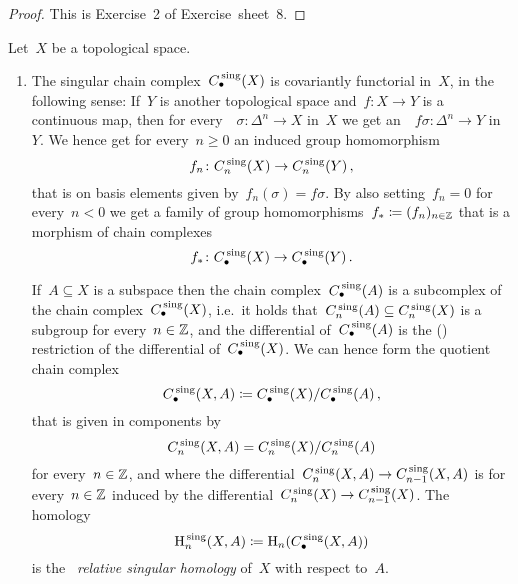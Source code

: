 \begin{proof}
  This is Exercise~2 of Exercise~sheet~8.
\end{proof}


\begin{example}
  Let~$X$ be a topological space.
  \begin{enumerate}
    \item
      The singular chain complex~$C_\bullet^{\,\mathrm{sing}}(X)$ is covariantly functorial in~$X$, in the following sense:
      If~$Y$ is another topological space and~$f \colon X \to Y$ is a continuous map, then for every~{}~$\sigma \colon \Delta^n \to X$ in~$X$ we get an~{}~$f \sigma \colon \Delta^n \to Y$ in~$Y$.
      We hence get for every~$n \geq 0$ an induced group homomorphism
      \[
        f_n
        \colon
        C^{\,\mathrm{sing}}_n(X)
        \to
        C^{\,\mathrm{sing}}_n(Y)  \,,
      \]
      that is on basis elements given by~$f_n(\sigma) = f \sigma$.
      By also setting~$f_n = 0$ for every~$n < 0$ we get a family of group homomorphisms~$f_* \coloneqq (f_n)_{n \in \mathbb{Z}}$ that is a morphism of chain complexes
      \[
        f_*
        \colon
        C_\bullet^{\,\mathrm{sing}}(X)
        \to
        C_\bullet^{\,\mathrm{sing}}(Y)
        \,.
      \]
      
      If~$A \subseteq X$ is a subspace then the chain complex~$C_\bullet^{\,\mathrm{sing}}(A)$ is a subcomplex of the chain complex~$C_\bullet^{\,\mathrm{sing}}(X)$, i.e.\ it holds that~$C^{\,\mathrm{sing}}_n(A) \subseteq C^{\,\mathrm{sing}}_n(X)$ is a subgroup for every~$n \in \mathbb{Z}$, and the differential of~$C_\bullet^{\,\mathrm{sing}}(A)$ is the ({\welldef}) restriction of the differential of~$C_\bullet^{\,\mathrm{sing}}(X)$.
      We can hence form the quotient chain complex
      \[
                  C_\bullet^{\,\mathrm{sing}}(X,A)
        \coloneqq  C_\bullet^{\,\mathrm{sing}}(X)/C_\bullet^{\,\mathrm{sing}}(A) \,,
      \]
      that is given in components by
      \[
          C^{\,\mathrm{sing}}_n(X,A)
        = C^{\,\mathrm{sing}}_n(X)/C^{\,\mathrm{sing}}_n(A)
      \]
      for every~$n \in \mathbb{Z}$, and where the differential~$C^{\,\mathrm{sing}}_n(X,A) \to C^{\,\mathrm{sing}}_{n-1}(X,A)$ is for every~$n \in \mathbb{Z}$ induced by the differential~$C^{\,\mathrm{sing}}_n(X) \to C^{\,\mathrm{sing}}_{n-1}(X)$.
      The homology
      \[
                  \operatorname{H}^{\,\mathrm{sing}}_n(X,A)
        \coloneqq  \operatorname{H}_n( C_\bullet^{\,\mathrm{sing}}(X,A) )
      \]
      is the~ \emph{relative singular homology} of~$X$ with respect to~$A$.
      

\end{enumerate}
\end{example}
